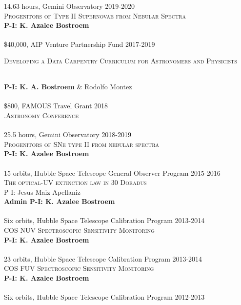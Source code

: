 \documentclass[10pt]{cv}
\begin{document}
\begin{llist}
14.63 hours, Gemini Observatory \hfill 2019-2020\\
\textsc{Progenitors of Type II Supernovae from Nebular Spectra}\\
\textbf{P-I: K. Azalee Bostroem}\\
\\
\$40,000, AIP Venture Partnership Fund \hfill 2017-2019\\
\begin{minipage}[l]{0.7\textwidth}\vspace{0.15cm}
\textsc{Developing a Data Carpentry Curriculum for Astronomers and Physicists}
\end{minipage}\vspace{0.15cm}\\
{\bf P-I: K. A. Bostroem} \& Rodolfo Montez\\
\\
\$800, FAMOUS Travel Grant \hfill2018\\ 
\textsc{.Astronomy Conference}\\
\\
25.5 hours, Gemini Observatory \hfill 2018-2019\\
\textsc{Progenitors of SNe type II from nebular spectra}\\
{\bf P-I: K. Azalee Bostroem} \\
\\
15 orbits, Hubble Space Telescope General Observer Program \hfill 2015-2016\\ %
\textsc{The optical-UV extinction law in 30 Doradus}\\
P-I: Jesus Maiz-Apellaniz \\
{\bf Admin P-I: K. Azalee Bostroem} \\
\\
Six orbits, Hubble Space Telescope Calibration Program \hfill 2013-2014\\ %
\textsc{COS NUV Spectroscopic Sensitivity Monitoring}\\
{\bf P-I: K. Azalee Bostroem} \\ %
\\
23 orbits, Hubble Space Telescope Calibration Program \hfill 2013-2014\\ %
\textsc{COS FUV Spectroscopic Sensitivity Monitoring}\\
{\bf P-I: K. Azalee Bostroem} \\ %
\\
Six orbits, Hubble Space Telescope Calibration Program \hfill 2012-2013\\ %

\end{llist}
\end{document}
